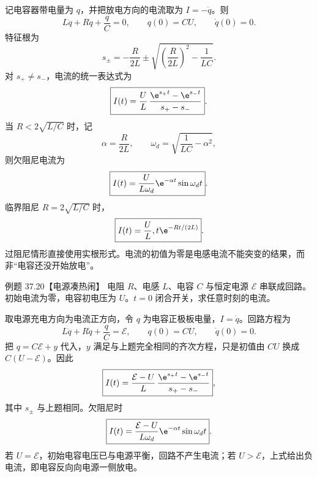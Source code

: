\begin{xesolution}
记电容器带电量为 $q$，并把放电方向的电流取为 $I=-\dot q$。则
\begin{equation}
  L\ddot q+R\dot q+\frac qC=0,
  \qquad q(0)=CU,
  \qquad \dot q(0)=0.
\end{equation}
特征根为
\begin{equation}
  s_\pm=-\frac{R}{2L}\pm
  \sqrt{\left(\frac{R}{2L}\right)^2-\frac1{LC}}.
\end{equation}
对 $s_+\ne s_-$，电流的统一表达式为
\begin{equation}
  \boxed{I(t)=\frac UL\,
  \frac{\e^{s_+t}-\e^{s_-t}}{s_+-s_-}}.
\end{equation}
当 $R<2\sqrt{L/C}$ 时，记
\begin{equation}
  \alpha=\frac{R}{2L},
  \qquad
  \omega_d=\sqrt{\frac1{LC}-\alpha^2},
\end{equation}
则欠阻尼电流为
\begin{equation}
  \boxed{I(t)=\frac{U}{L\omega_d}\e^{-\alpha t}\sin\omega_dt}.
\end{equation}
临界阻尼 $R=2\sqrt{L/C}$ 时，
\begin{equation}
  \boxed{I(t)=\frac UL,t\e^{-Rt/(2L)}}.
\end{equation}
过阻尼情形直接使用实根形式。电流的初值为零是电感电流不能突变的结果，而非“电容还没开始放电”。

\end{xesolution}

\Needspace{0.12\textheight}
\begin{origexamplebox}{例题 37.20【电源凑热闹】}
电阻 $R$、电感 $L$、电容 $C$ 与恒定电源 $\mathcal E$ 串联成回路。初始电流为零，电容初电压为 $U$。$t=0$ 闭合开关，求任意时刻的电流。
\end{origexamplebox}

\begin{xesolution}
取电源充电方向为电流正方向，令 $q$ 为电容正极板电量，$I=\dot q$。回路方程为
\begin{equation}
  L\ddot q+R\dot q+\frac qC=\mathcal E,
  \qquad q(0)=CU,
  \qquad \dot q(0)=0.
\end{equation}
把 $q=C\mathcal E+y$ 代入，$y$ 满足与上题完全相同的齐次方程，只是初值由 $CU$ 换成 $C(U-\mathcal E)$。因此
\begin{equation}
  \boxed{I(t)=\frac{\mathcal E-U}{L}\,
  \frac{\e^{s_+t}-\e^{s_-t}}{s_+-s_-}},
\end{equation}
其中 $s_\pm$ 与上题相同。欠阻尼时
\begin{equation}
  \boxed{I(t)=\frac{\mathcal E-U}{L\omega_d}
  \e^{-\alpha t}\sin\omega_dt}.
\end{equation}
若 $U=\mathcal E$，初始电容电压已与电源平衡，回路不产生电流；若 $U>\mathcal E$，上式给出负电流，即电容反向向电源一侧放电。

\end{xesolution}

